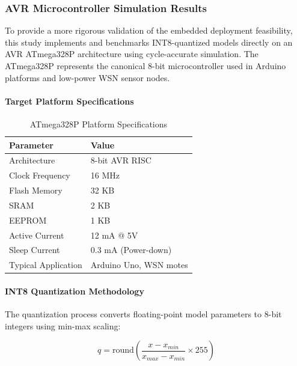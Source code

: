 

\subsubsection{AVR Microcontroller Simulation Results}

To provide a more rigorous validation of the embedded deployment feasibility, this study implements and benchmarks INT8-quantized models directly on an AVR ATmega328P architecture using cycle-accurate simulation. The ATmega328P represents the canonical 8-bit microcontroller used in Arduino platforms and low-power WSN sensor nodes.

\paragraph{Target Platform Specifications}

\begin{table}[htbp]
\centering
\caption{ATmega328P Platform Specifications}
\label{tab:atmega328p_specs}
\begin{tabular}{ll}
\hline
\textbf{Parameter} & \textbf{Value} \\
\hline
Architecture & 8-bit AVR RISC \\
Clock Frequency & 16 MHz \\
Flash Memory & 32 KB \\
SRAM & 2 KB \\
EEPROM & 1 KB \\
Active Current & 12 mA @ 5V \\
Sleep Current & 0.3 mA (Power-down) \\
Typical Application & Arduino Uno, WSN motes \\
\hline
\end{tabular}
\end{table}

\paragraph{INT8 Quantization Methodology}

The quantization process converts floating-point model parameters to 8-bit integers using min-max scaling:

\begin{equation}
    q = \text{round}\left(\frac{x - x_{min}}{x_{max} - x_{min}} \times 255\right)
\end{equation}

